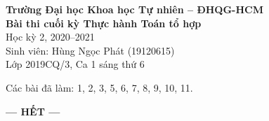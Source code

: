 \documentclass[12pt]{article}
\begin{document}
\begin{center}
    \large{\bfseries Trường Đại học Khoa học Tự nhiên -- ĐHQG-HCM}\\
    \LARGE{\bfseries Bài thi cuối kỳ Thực hành Toán tổ hợp} \\
    \Large{Học kỳ 2, 2020--2021}\\
    \large{Sinh viên: Hùng Ngọc Phát (19120615)}\\
    \large{Lớp 2019CQ/3, Ca 1 sáng thứ 6}\\[1.5cm]
\end{center}

Các bài đã làm: 1, 2, 3, 5, 6, 7, 8, 9, 10, 11.

\newpage
\newpage
\newpage
\newpage
\newpage
\newpage
\newpage
\newpage


\begin{center}
    \bfseries{--- HẾT ---}
\end{center}

% 
% 
\end{document}

